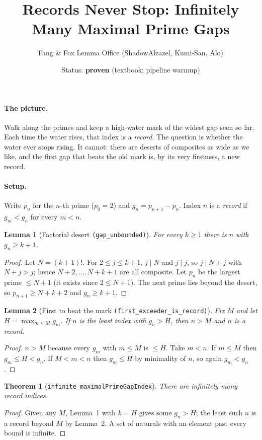 \documentclass[11pt]{article}
\title{Records Never Stop: Infinitely Many Maximal Prime Gaps}
\author{Fang \& Fox Lemma Office (ShadowAlzazel, Kumi-San, Alo)}
\date{Status: \textbf{proven} (textbook; pipeline warmup)}
\newtheorem{lemma}{Lemma}\newtheorem{theorem}{Theorem}
\begin{document}
\maketitle

\paragraph{The picture.} Walk along the primes and keep a high-water mark of the
widest gap seen so far. Each time the water rises, that index is a \emph{record}.
The question is whether the water ever stops rising. It cannot: there are deserts
of composites as wide as we like, and the first gap that beats the old mark is,
by its very firstness, a new record.

\paragraph{Setup.} Write $p_n$ for the $n$-th prime ($p_0=2$) and $g_n=p_{n+1}-p_n$.
Index $n$ is a \emph{record} if $g_m<g_n$ for every $m<n$.

\begin{lemma}[Factorial desert \texttt{(gap\_unbounded)}]
For every $k\ge 1$ there is $n$ with $g_n\ge k+1$.
\end{lemma}
\begin{proof}
Let $N=(k+1)!$. For $2\le j\le k+1$, $j\mid N$ and $j\mid j$, so $j\mid N+j$ with
$N+j>j$; hence $N+2,\dots,N+k+1$ are all composite. Let $p_n$ be the largest prime
$\le N+1$ (it exists since $2\le N+1$). The next prime lies beyond the desert, so
$p_{n+1}\ge N+k+2$ and $g_n\ge k+1$.
\end{proof}

\begin{lemma}[First to beat the mark \texttt{(first\_exceeder\_is\_record)}]
Fix $M$ and let $H=\max_{m\le M} g_m$. If $n$ is the \emph{least} index with
$g_n>H$, then $n>M$ and $n$ is a record.
\end{lemma}
\begin{proof}
$n>M$ because every $g_m$ with $m\le M$ is $\le H$. Take $m<n$. If $m\le M$ then
$g_m\le H<g_n$. If $M<m<n$ then $g_m\le H$ by minimality of $n$, so again $g_m<g_n$.
\end{proof}

\begin{theorem}[\texttt{infinite\_maximalPrimeGapIndex}]
There are infinitely many record indices.
\end{theorem}
\begin{proof}
Given any $M$, Lemma~1 with $k=H$ gives some $g_n>H$; the least such $n$ is a record
beyond $M$ by Lemma~2. A set of naturals with an element past every bound is infinite.
\end{proof}
\end{document}
